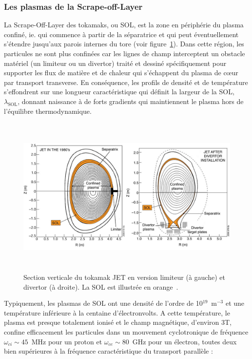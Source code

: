 \begin{refsection}
\subsubsection{Les plasmas de la Scrape-off-Layer}
La Scrape-Off-Layer des tokamaks, ou SOL, est la zone en
périphérie du plasma confiné, ie. qui commence à partir de la séparatrice et qui
peut éventuellement s'étendre jusqu'aux parois internes du tore (voir
figure~\ref{SOL}). Dans cette région, les
particules ne sont plus confinées car les lignes de champ interceptent un
obstacle matériel (un limiteur ou un divertor) traité et dessiné spécifiquement
pour supporter les flux de matière et de chaleur qui s'échappent du plasma de
c\oe ur par transport transverse.
En conséquence, les profils de densité et de température s'effondrent sur une
longueur caractéristique qui définit la largeur de la SOL, $\lambda_\text{SOL}$,
donnant naissance à de forts gradients qui maintiennent le plasma hors
de l'équilibre thermodynamique.

\begin{figure}[!htbp]
    \centering
	\includegraphics[height=80mm]{figures/1-limiterDivertor.jpg}
	\caption{Section verticale du tokamak JET en version limiteur
	(à gauche) et divertor (à droite). La SOL est illustrée en
	orange~\parencite{efda}.}\label{SOL}
\end{figure}
 
Typiquement, les plasmas de SOL ont une densité de
l'ordre de 10$^{19}$~m$^{-3}$ et une température inférieure à la centaine
d'électronvolts. A cette température, le plasma est presque totalement ionisé et
le champ magnétique, d'environ 3T, confine efficacement les particules dans un
mouvement cyclotronique de fréquence $\omega_{ci}\sim45$~MHz pour un proton et
$\omega_{ce}\sim80$~GHz pour un électron, toutes deux bien supérieures à la
fréquence caractéristique du transport parallèle :


\end{refsection}
